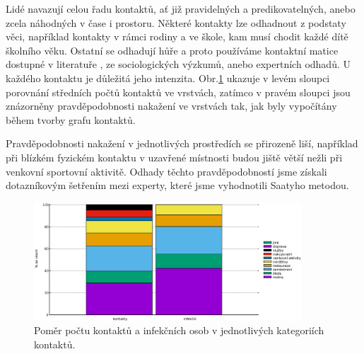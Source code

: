 Lidé navazují celou řadu kontaktů, ať již pravidelných a predikovatelných, anebo zcela náhodných v čase i prostoru. 
Některé kontakty lze odhadnout z podstaty věci, například kontakty v rámci rodiny a ve škole, kam musí chodit každé dítě školního věku. Ostatní se odhadují hůře a proto používáme kontaktní matice dostupné v literatuře \cite{Prem_etal2017}, ze sociologických výzkumů, anebo expertních odhadů. 
U každého kontaktu je důležitá jeho intenzita. Obr.\ref{kategorie} ukazuje v levém sloupci porovnání středních počtů kontaktů ve vrstvách, zatímco v pravém sloupci jsou znázorněny pravděpodobnosti nakažení ve vrstvách tak, jak byly vypočítány během tvorby grafu kontaktů.


Pravděpodobnosti nakažení v jednotlivých prostředích se přirozeně liší, například při blízkém fyzickém kontaktu v uzavřené místnosti budou jiště větší nežli při venkovní sportovní aktivitě. Odhady těchto pravděpodobností jsme získali dotazníkovým šetřením mezi experty, které jsme vyhodnotili Saatyho metodou.

\begin{figure}
    \centering
    \includegraphics[width=10cm]{pic/filled_cz.eps}
    \caption{Poměr počtu kontaktů a infekčních osob v jednotlivých kategoriích kontaktů.}
    \label{kategorie}
\end{figure}

